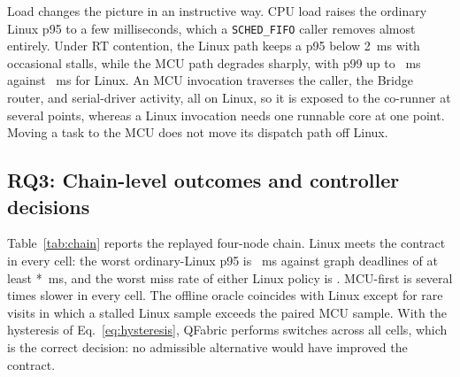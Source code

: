 \documentclass[conference]{IEEEtran}
\newcommand{\system}{QFabric\xspace}
\begin{document}
\begin{table}[t]
\caption{Idle per-call decomposition (Eq.~\ref{eq:decomposition}). Compute is
measured inside each executor; the residual is the difference of medians.}
\label{tab:decomposition}
\centering
\footnotesize
\setlength{\tabcolsep}{4pt}

\end{table}

Load changes the picture in an instructive way. CPU load raises the
ordinary Linux p95 to a few milliseconds, which a \texttt{SCHED\_FIFO} caller
removes almost entirely. Under RT contention, the Linux path keeps a p95
below 2~ms with occasional stalls, while the MCU path degrades sharply, with
p99 up to \StageTwelveContentionRtPNinetyNine~ms against
\StageTwelveContentionLinuxPNinetyNine~ms for Linux. An MCU invocation
traverses the caller, the Bridge router, and serial-driver activity, all on
Linux, so it is exposed to the co-runner at several points, whereas a Linux
invocation needs one runnable core at one point. Moving a task to the MCU
does not move its dispatch path off Linux.

\subsection{RQ3: Chain-level outcomes and controller decisions}
\label{sec:chain}
Table~\ref{tab:chain} reports the replayed four-node chain. Linux meets the
contract in every cell: the worst ordinary-Linux p95 is
\StageTwelveWorstLinuxChainP~ms against graph deadlines of at least
\the{}*\StageTwelveMinNodeDeadline\relax~ms, and the worst miss rate
of either Linux policy is \StageTwelveWorstLinuxMiss. MCU-first is several
times slower in every cell. The offline oracle coincides with Linux except
for rare visits in which a stalled Linux sample exceeds the paired MCU sample.
With the hysteresis of Eq.~\eqref{eq:hysteresis}, \system performs
\StageTwelveSwitches{} switches across all \StageTwelveCells{} cells, which is
the correct decision: no admissible alternative would have improved the
contract.

\begin{table}[t]
\caption{Replayed four-node chain (\StageTwelveChainObservations{}
observations per cell). $D_G$ is the graph deadline of
Eq.~\eqref{eq:deadline}; ``stay'' means neither recovery variant switched.}
\label{tab:chain}
\centering
\footnotesize

\end{table}
\end{document}
